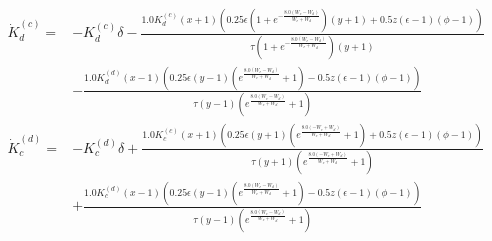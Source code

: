 \begin{align*}
%
  \dot{K}_d^{(c)}=&- K^{(c)}_{d} \delta - \frac{1.0 K^{(c)}_{d} \left(x + 1\right) \left(0.25 \epsilon \left(1 + e^{- \frac{8.0 \left(W_{c} - W_{d}\right)}{W_{c} + W_{d}}}\right) \left(y + 1\right) + 0.5 z \left(\epsilon - 1\right) \left(\phi - 1\right)\right)}{\tau \left(1 + e^{- \frac{8.0 \left(W_{c} - W_{d}\right)}{W_{c} + W_{d}}}\right) \left(y + 1\right)} \\
&- \frac{1.0 K^{(d)}_{d} \left(x - 1\right) \left(0.25 \epsilon \left(y - 1\right) \left(e^{\frac{8.0 \left(W_{c} - W_{d}\right)}{W_{c} + W_{d}}} + 1\right) - 0.5 z \left(\epsilon - 1\right) \left(\phi - 1\right)\right)}{\tau \left(y - 1\right) \left(e^{\frac{8.0 \left(W_{c} - W_{d}\right)}{W_{c} + W_{d}}} + 1\right)}\\
%
\dot{K}_c^{(d)}=& - K^{(d)}_{c} \delta +\frac{1.0 K^{(c)}_{c} \left(x + 1\right) \left(0.25 \epsilon \left(y + 1\right) \left(e^{\frac{8.0 \left(- W_{c} + W_{d}\right)}{W_{c} + W_{d}}} + 1\right) + 0.5 z \left(\epsilon - 1\right) \left(\phi - 1\right)\right)}{\tau \left(y + 1\right) \left(e^{\frac{8.0 \left(- W_{c} + W_{d}\right)}{W_{c} + W_{d}}} + 1\right)} \\
&+ \frac{1.0 K^{(d)}_{c} \left(x - 1\right) \left(0.25 \epsilon \left(y - 1\right) \left(e^{\frac{8.0 \left(W_{c} - W_{d}\right)}{W_{c} + W_{d}}} + 1\right) - 0.5 z \left(\epsilon - 1\right) \left(\phi - 1\right)\right)}{\tau \left(y - 1\right) \left(e^{\frac{8.0 \left(W_{c} - W_{d}\right)}{W_{c} + W_{d}}} + 1\right)}
\end{align*}
